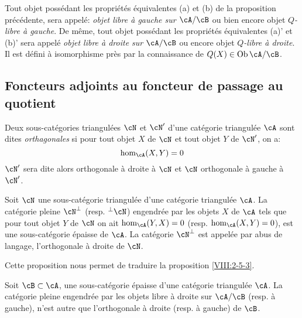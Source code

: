 \begin{definition}\label{VIII:2-5-4}
Tout objet possédant les propriétés équivalentes (a) et (b) de la 
proposition précédente, sera appelé: \emph{objet libre à gauche sur 
$\cA/\cB$} ou bien encore objet \emph{$Q$-libre à gauche}. De même, tout 
objet possédant les propriétés équivalentes (a)' et (b)' sera appelé 
\emph{objet libre à droite sur $\cA/\cB$} ou encore objet 
\emph{$Q$-libre à droite}. Il est défini à isomorphisme près par la 
connaissance de $Q(X)\in\operatorname{Ob}{\cA/\cB}$. 
\end{definition}





\subsection{Foncteurs adjoints au foncteur de passage au quotient}\label{VIII:2-6}





\begin{definition}\label{VIII:2-6-1}
Deux sous-catégories triangulées $\cN$ et $\cN'$ d'une catégorie 
triangulée $\cA$ sont dites \emph{orthagonales} si pour tout objet $X$ de 
$\cN$ et tout objet $Y$ de $\cN'$, on a: 
\[
  \hom_\cA(X,Y) = 0 
\]
$\cN'$ sera dite alors orthogonale à droite à $\cN$ et $\cN$ orthogonale 
à gauche à $\cN'$. 
\end{definition}





\begin{proposition}\label{VIII:2-6-2}
Soit $\cN$ une sous-catégorie triangulée d'une catégorie triangulée 
$\cA$. La catégorie pleine $\cN^\bot$ (resp. $^\bot\cN$) engendrée par les 
objets $X$ de $\cA$ tels que pour tout objet $Y$ de $\cN$ on ait 
$\hom_\cA(Y,X)=0$ (resp. $\hom_\cA(X,Y)=0$), est une sous-catégorie épaisse 
de $\cA$. La catégorie $\cN^\bot$ est appelée par abus de langage, 
l'orthogonale à droite de $\cN$. 
\end{proposition}

Cette proposition nous permet de traduire la proposition \ref{VIII:2-5-3}. 





\begin{proposition}\label{VIII:2-6-3}
Soit $\cB\subset\cA$, une sous-catégorie épaisse d'une catégorie 
triangulée $\cA$. La catégorie pleine engendrée par les objets libre à 
droite sur $\cA/\cB$ (resp. à gauche), n'est autre que l'orthogonale à 
droite (resp. à gauche) de $\cB$. 
\end{proposition}





